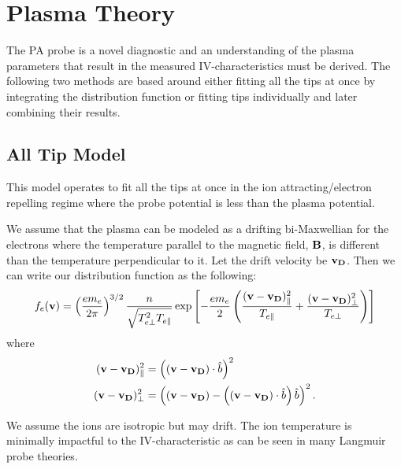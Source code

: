 \section{Plasma Theory}

The PA probe is a novel diagnostic and an understanding of the plasma parameters that result in the measured IV-characteristics must be derived. The following two methods are based around either fitting all the tips at once by integrating the distribution function or fitting tips individually and later combining their results.

\subsection{All Tip Model}

This model operates to fit all the tips at once in the ion attracting/electron repelling regime where the probe potential is less than the plasma potential.


We assume that the plasma can be modeled as a drifting bi-Maxwellian for the electrons where the temperature parallel to the magnetic field, $\vb{B}$, is different than the temperature perpendicular to it. Let the drift velocity be $\vb{v_D}$. Then we can write our distribution function as the following:
\begin{equation}
    f_e(\vb{v}) = \left(\frac{e m_e}{2\pi}\right)^{3/2} \frac{n}{\sqrt{T_{e\perp}^2 T_{e\parallel}}} \exp\left[-\frac{e m_e}{2} \left(\frac{(\vb{v} - \vb{v_D})_\parallel^2}{T_{e\parallel}} + \frac{(\vb{v} - \vb{v_D})_\perp^2}{T_{e\perp}}\right)\right]
    \label{eq:drifting_bimaxwellian}
\end{equation}
where
\begin{align*}
    (\vb{v} - \vb{v_D})_\parallel^2 &= \left((\vb{v} - \vb{v_D}) \cdot \hat{b}\right)^2 \\
    (\vb{v} - \vb{v_D})_\perp^2 &= \left((\vb{v} - \vb{v_D}) - \left((\vb{v} - \vb{v_D}) \cdot \hat{b}\right) \hat{b} \right)^2.
\end{align*}

We assume the ions are isotropic but may drift. The ion temperature is minimally impactful to the IV-characteristic as can be seen in many Langmuir probe theories.


